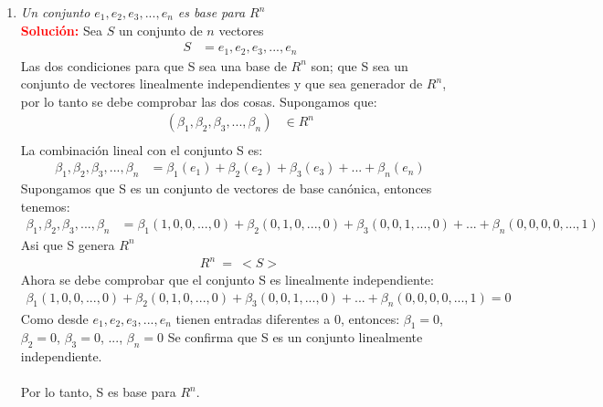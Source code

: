 \documentclass[12pt]{article}
\begin{document}
\begin{enumerate}
\item \textit{Un conjunto ${e_{1}, e_{2}, e_{3}, ..., e_{n}}$ es base para $R^{n}$}  \\
\noindent \textcolor{red}{\bf Solución:} Sea $S$ un conjunto de $n$ vectores \\
\begin {equation*} \begin {split}
    S &= {e_{1},e_{2},e_{3}, ..., e_{n}} 
\end {split} \end {equation*} 
Las dos condiciones para que S sea una base de $R^{n}$ son; que S sea un conjunto de vectores linealmente independientes y que sea generador de $R^{n}$, por lo tanto se debe comprobar las dos cosas. 
Supongamos que: 
\begin {equation*} \begin {split}
 (\beta_{1}, \beta_{2}, \beta_{3}, ..., \beta_{n}) &\in R^{n} \\
 \end {split} \end {equation*} 
La combinación lineal con el conjunto S es: \\ 
 \begin {equation*} \begin {split}
\beta_{1}, \beta_{2}, \beta_{3}, ..., \beta_{n} &= \beta_{1}(e_{1}) + \beta_{2}(e_{2}) + \beta_{3}(e_{3}) + ... + \beta_{n}(e_{n}) 
\end {split} \end {equation*} 
Supongamos que S es un conjunto de vectores de base canónica, entonces tenemos: 
\begin {equation*} \begin {split}
\beta_{1}, \beta_{2}, \beta_{3}, ..., \beta_{n} &= \beta_{1}(1,0,0,...,0) + \beta_{2}(0,1,0,...,0) + \beta_{3}(0,0,1,...,0) + ... + \beta_{n}(0,0,0,0,...,1) 
\end {split} \end {equation*} 
Asi que S genera $R^{n}$ 
\begin {equation*} \begin {split}
R^{n} \ = \ <S>
\end {split} \end {equation*} 
Ahora se debe comprobar que el conjunto S es linealmente independiente:
\begin {equation*}
\begin {split}
\beta_{1}(1,0,0,...,0) + \beta_{2}(0,1,0,...,0) + \beta_{3}(0,0,1,...,0) + ... + \beta_{n}(0,0,0,0,...,1) = 0 
\end {split}
\end {equation*} 
Como desde  ${e_{1}, e_{2}, e_{3}, ..., e_{n}}$ tienen entradas diferentes a 0, entonces:
$\beta_{1} = 0$,
$\beta_{2} = 0$,
$\beta_{3} = 0$,
...,
$\beta_{n} = 0$
Se confirma que S es un conjunto linealmente independiente. \\ \\
Por lo tanto, S es base para $R^{n}$.\\


\end{enumerate}
\end{document}
